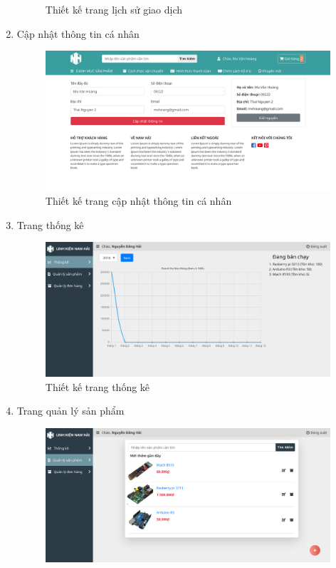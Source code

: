 \begin{enumerate}[label=\textbf{\alph*)}]
\begin{figure}[h!]
		      \caption{Thiết kế trang lịch sử giao dịch}
	      \end{figure}
	\item Cập nhật thông tin cá nhân
	      \begin{figure}[h!]
		      \centering
		      \includegraphics[width=\linewidth]{fig/r_user2.png}
		      \caption{Thiết kế trang cập nhật thông tin cá nhân}
	      \end{figure}
	      \newpage
	\item Trang thống kê
	      \begin{figure}[h!]
		      \centering
		      \includegraphics[width=\linewidth]{fig/r_manage_statistics.png}
		      \caption{Thiết kế trang thống kê}
	      \end{figure}
	\item Trang quản lý sản phẩm
	      \begin{figure}[h!]
		      \centering
		      \includegraphics[width=\linewidth]{fig/r_manage_product.png}

\end{figure}
\end{enumerate}
